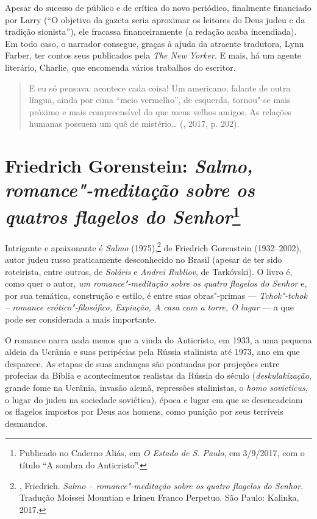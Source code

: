 Apesar do sucesso de público e de crítica do novo periódico,
finalmente financiado por Larry (``O objetivo da gazeta seria
aproximar os leitores do Deus judeu e da tradição sionista''), ele
fracassa financeiramente (a redação acaba incendiada).
Em todo caso, o narrador consegue, graças à ajuda da atraente
tradutora, Lynn Farber, ter contos seus publicados pela
\emph{The New Yorker}. E mais, há um agente literário,
Charlie, que encomenda vários trabalhos do escritor.

\begin{quotation}
E eu só pensava: acontece cada coisa! Um americano, falante de outra língua, ainda por cima ``meio vermelho'', de esquerda, tornou"-se mais próximo e mais compreensível do que meus velhos amigos. As relações humanas possuem um quê de mistério\ldots{} (, 2017, p. 202).

\end{quotation}

\chapter*{Friedrich Gorenstein: \emph{Salmo, romance"-meditação sobre os quatros flagelos do Senhor}\footnote{Publicado no Caderno Aliás, em \emph{O Estado de S. Paulo}, em 3/9/2017, com o título ``A sombra do Anticristo''.}}

\label{gorenstein}

Intrigante e apaixonante é \emph{Salmo} (1975),\footnote{, Friedrich. 
\emph{Salmo -- romance"-meditação sobre os quatro flagelos do Senhor}. 
Tradução Moissei Mountian e Irineu Franco Perpetuo. São Paulo: Kalinka,
 2017.} de Friedrich Gorenstein (1932--2002), autor judeu russo
praticamente desconhecido no Brasil (apesar de ter sido roteirista, entre outros, de \emph{Soláris}
e \emph{Andrei Rubliov}, de Tarkóvski). O livro é, como quer o autor,
\emph{um romance"-meditação sobre os quatro flagelos do Senhor} e,
por sua temática, construção e estilo, é entre suas obras"-primas
--- \emph{Tchok"-tchok -- romance erótico"-filosófico, Expiação, A casa com a
torre, O lugar} --- a que pode ser considerada a mais importante.

O romance narra nada menos que a vinda do Anticristo, em 1933, a uma
pequena aldeia da Ucrânia e suas peripécias pela Rússia stalinista até
1973, ano em que desparece. As etapas de suas andanças são pontuadas por
projeções entre profecias da Bíblia e acontecimentos realistas da Rússia
do século  (\emph{deskulakização}, grande fome na Ucrânia, invasão alemã,
repressões stalinistas, o \emph{homo sovieticus}, o lugar do judeu na
sociedade soviética), época e lugar em que se desencadeiam os flagelos
impostos por Deus aos homens, como punição por seus terríveis desmandos.

